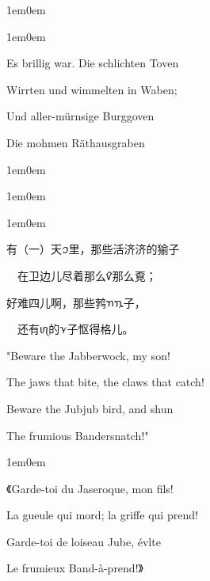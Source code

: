 \documentclass[
  12pt,
  twoside,
  openright,
  oldfontcommands,
]{memoir}
\begin{document}
\hfill\break

\begin{adjustwidth}{1em}{0em}

\begin{adjustwidth}{1em}{0em}

Es brillig war. Die schlichten Toven

Wirrten und wimmelten in Waben;

Und aller-mürnsige Burggoven

Die mohmen Räth\textquotesingle ausgraben

\end{adjustwidth}

\end{adjustwidth}

\hfill\break

\begin{adjustwidth}{1em}{0em}

\begin{adjustwidth}{1em}{0em}

\begin{adjustwidth}{1em}{0em}

有（一）天{\gebfont ꪫ}里，那些活济济的㺄子

　在卫边儿尽着那么{\gebfont ꪥ}那么覔；

好难四儿啊，那些鹁{\gebfont ꪦ}{\gebfont ꪧ}子，

　还有{\gebfont ꪨ}的{\gebfont ꪩ}子怄得格儿。

\end{adjustwidth}

\end{adjustwidth}

\end{adjustwidth}

\hfill\break

"Beware the Jabberwock, my son!

The jaws that bite, the claws that catch!

Beware the Jubjub bird, and shun

The frumious Bandersnatch!"

\hfill\break

\begin{adjustwidth}{1em}{0em}

《Garde-toi du Jaseroque, mon fils!

La gueule qui mord; la griffe qui prend!

Garde-toi de l\textquotesingle oiseau Jube, évlte

Le frumieux Band-à-prend!》

\end{adjustwidth}
\end{document}
